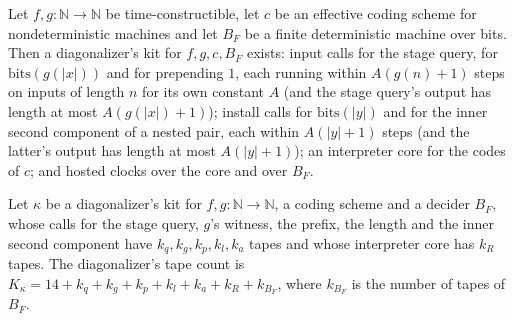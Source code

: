 \begin{theorem}
\label{Turing.NTimeDiag.dz_kit_exists}
\leanok
{}
Let $f, g : \mathbb{N} \to \mathbb{N}$ be time-constructible, let $c$ be an effective coding scheme
for nondeterministic machines and let $B_F$ be a finite deterministic machine over bits. Then a
diagonalizer's kit for $f, g, c, B_F$ exists: input calls for the stage query, for
$\mathrm{bits}(g(|x|))$ and for prepending $1$, each running within $A(g(n) + 1)$ steps on inputs of
length $n$ for its own constant $A$ (and the stage query's output has length at most
$A(g(|x|) + 1)$); install calls for $\mathrm{bits}(|y|)$ and for the inner second component of a
nested pair, each within $A(|y| + 1)$ steps (and the latter's output has length at most
$A(|y| + 1)$); an interpreter core for the codes of $c$; and hosted clocks over the core and over
$B_F$.
\end{theorem}

\begin{definition}
\label{Turing.NTimeDiag.DzKit.K}
\leanok
{}
Let $\kappa$ be a diagonalizer's kit for $f, g : \mathbb{N} \to \mathbb{N}$, a coding scheme and a
decider $B_F$, whose calls for the stage query, $g$'s witness, the prefix, the length and the inner
second component have $k_q, k_g, k_p, k_l, k_a$ tapes and whose interpreter core has $k_R$ tapes.
The diagonalizer's tape count is $K_\kappa = 14 + k_q + k_g + k_p + k_l + k_a + k_R + k_{B_F}$,
where $k_{B_F}$ is the number of tapes of $B_F$.
\end{definition}

